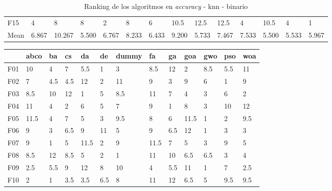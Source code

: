 \begin{table}
\begin{adjustbox}{width=\linewidth}
\begin{tabular}{llllllllllllll}
            F15  & 4     & 8      & 8     & 2     & 8     & 6     & 10.5  & 12.5  & 12.5  & 4     & 10.5  & 4     & 1     \\
            Mean & 6.867 & 10.267 & 5.500 & 6.767 & 8.233 & 6.433 & 9.200 & 5.733 & 7.467 & 7.533 & 5.500 & 5.533 & 5.967 \\
            \bottomrule
        \end{tabular}
    \end{adjustbox}
    \caption{Ranking de los algoritmos en \textit{accuracy} - knn - binario}
    \label{tab:ranking_accuracy_bin_knn}
\end{table}

\begin{table}
    \centering
    \begin{adjustbox}{width=\linewidth}
        \begin{tabular}{lllllllllllll}
            \toprule
            {}   & abco  & ba    & cs    & da    & de    & dummy & fa    & ga    & goa   & gwo   & pso   & woa   \\
            \midrule
            F01  & 10    & 4     & 7     & 5.5   & 1     & 3     & 8.5   & 12    & 2     & 8.5   & 5.5   & 11    \\
            F02  & 7     & 4.5   & 4.5   & 12    & 2     & 11    & 9     & 3     & 9     & 6     & 1     & 9     \\
            F03  & 8.5   & 10    & 12    & 1     & 5     & 8.5   & 11    & 7     & 4     & 3     & 6     & 2     \\
            F04  & 11    & 4     & 2     & 6     & 5     & 7     & 9     & 1     & 8     & 3     & 10    & 12    \\
            F05  & 11.5  & 4     & 7     & 5     & 3     & 9.5   & 8     & 6     & 11.5  & 1     & 2     & 9.5   \\
            F06  & 9     & 3     & 6.5   & 9     & 11    & 5     & 9     & 6.5   & 12    & 1     & 3     & 3     \\
            F07  & 9     & 1     & 5     & 11.5  & 2     & 9     & 11.5  & 7     & 5     & 3     & 9     & 5     \\
            F08  & 8.5   & 12    & 8.5   & 5     & 2     & 1     & 11    & 10    & 6.5   & 6.5   & 3     & 4     \\
            F09  & 2.5   & 5.5   & 9     & 12    & 8     & 10    & 4     & 5.5   & 11    & 1     & 7     & 2.5   \\
            F10  & 2     & 1     & 3.5   & 3.5   & 6.5   & 8     & 11    & 12    & 6.5   & 5     & 9.5   & 9.5   \\

\end{tabular}
\end{adjustbox}
\end{table}
